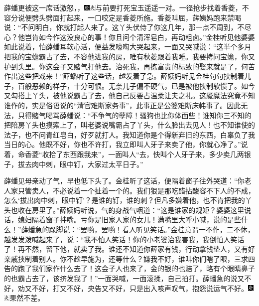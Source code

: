 薛蟠更被这一席话激怒，，{\includegraphics[width=3mm]{../Images/00004}\includegraphics[width=3mm]{../Images/00012}\footnotesize \kaishu 与前要打死宝玉遥遥一对。}一径抢步找着香菱，不容分说便劈头劈面打起来，一口咬定是香菱所施。香菱叫屈，薛姨妈跑来禁喝说：``不问明白，你就打起人来了。这丫头伏侍了你这几年，那一点不周到，不尽心？他岂肯如今作这没良心的事！你且问个清浑皂白，再动粗卤。''金桂听见他婆婆如此说着，怕薛蟠耳软心活，便益发嚎啕大哭起来，一面又哭喊说：``这半个多月把我的宝蟾霸占了去，不容他进我的房，唯有秋菱跟着我睡。我要拷问宝蟾，你又护到头里。你这会子又赌气打他去。治死我，再拣富贵的标致的娶来就是了，何苦作出这些把戏来！''薛蟠听了这些话，越发着了急。薛姨妈听见金桂句句挟制着儿子，百般恶赖的样子，十分可恨。无奈儿子偏不硬气，已是被他挟制软惯了。如今又勾搭上丫头，被他说霸占了去，他自己反要占温柔让夫之礼。这魇魔法究竟不知谁作的，实是俗语说的``清官难断家务事''，此事正是公婆难断床帏事了。因此无法，只得赌气喝骂薛蟠说：``不争气的孽障！骚狗也比你体面些！谁知你三不知的把陪房丫头也摸索上了，叫老婆说嘴霸占了丫头，什么脸出去见人！也不知谁使的法子，也不问青红皂白，好歹就打人。我知道你是个得新弃旧的东西，白辜负了我当日的心。他既不好，你也不许打，我立即叫人牙子来卖了他，你就心净了。''说着，命香菱``收拾了东西跟我来''，一面叫人``去，快叫个人牙子来，多少卖几两银子，拔去肉中刺，眼中钉，大家过太平日子。''

薛蟠见母亲动了气，早也低下头了。金桂听了这话，便隔着窗子往外哭道：``你老人家只管卖人，不必说着一个扯着一个的。我们狠是那吃醋拈酸容不下人的不成，怎么`拔出肉中刺，眼中钉'？是谁的钉，谁的刺？但凡多嫌着他，也不肯把我的丫头也收在房里了。''薛姨妈听说，气的身战气咽道：``这是谁家的规矩？婆婆这里说话，媳妇隔着窗子拌嘴。亏你是旧家人家的女儿！满嘴里大呼小喊，说的是些什么！''薛蟠急的跺脚说：``罢哟，罢哟！看人听见笑话。''金桂意谓一不作，二不休，越发发泼喊起来了，说：``我不怕人笑话！你的小老婆治我害我，我倒怕人笑话了！再不然，留下他，就卖了我。谁还不知道你薛家有钱，行动拿钱垫人，又有好亲戚挟制着别人。你不趁早施为，还等什么？嫌我不好，谁叫你们瞎了眼，三求四告的跑了我们家作什么去了！这会子人也来了，金的银的也赔了，略有个眼睛鼻子的也霸占去了，该挤发我了！''一面哭喊，一面滚揉，自己拍打。薛蟠急的说又不好，劝又不好，打又不好，央告又不好，只是出入咳声叹气，抱怨说运气不好。{\includegraphics[width=3mm]{../Images/00004}\includegraphics[width=3mm]{../Images/00012}\footnotesize \kaishu 果然不差。}

